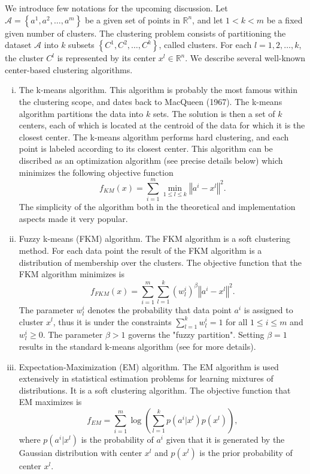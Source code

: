 \documentclass[12pt]{article}
\numberwithin{equation}{section}
\newcommand{\norm}[1]{\left\Vert {#1} \right\Vert} %
\begin{document}
We introduce few notations for the upcoming discussion. Let $\mathcal{A}= \left\lbrace a^1, a^2, \ldots ,a^m \right\rbrace$ be a given set of points in $\mathbb{R}^n$, and let $1 < k < m$ be a fixed given number of clusters. The clustering problem consists of partitioning the dataset $\mathcal{A}$ into $k$ subsets $\left\lbrace C^1, C^2, \ldots ,C^k \right\rbrace$, called clusters. For each $l=1, 2, \ldots ,k$, the cluster $C^l$ is represented by its center $x^l \in \mathbb{R}^n$. We describe several well-known center-based clustering algorithms.
\begin{enumerate}[(i)]
	\item The k-means algorithm. This algorithm is probably the most famous within the clustering scope, and dates back to MacQueen (1967). The k-means algorithm partitions the data into $k$ sets. The solution is then a set of $k$ centers, each of which is located at the centroid of the data for which it is the closest center. The k-means algorithm performs hard clustering, and each point is labeled according to its closest center. This algorithm can be discribed as an optimization algorithm (see precise details below) which minimizes the following objective function
	\begin{equation*}
		f_{KM}(x) = \sum\limits_{i=1}^{m}\min\limits_{1 \le l \le k} \norm{a^i-x^l}^2.
	\end{equation*}
	The simplicity of the algorithm both in the theoretical and implementation aspects made it very popular.
	\item Fuzzy k-means (FKM) algorithm. The FKM algorithm is a soft clustering method. For each data point the result of the FKM algorithm is a distribution of membership over the clusters. The objective function that the FKM algorithm minimizes is
	\begin{equation*}
		f_{FKM}(x) = \sum\limits_{i=1}^{m}\sum\limits_{l=1}^{k}(w^i_l)^\beta \norm{a^i-x^l}^2.
	\end{equation*}
	The parameter $w^i_l$ denotes the probability that data point $a^i$ is assigned to cluster $x^l$, thus it is under the constraints $\sum_{l=1}^{k} w^i_l = 1$ for all $1 \leq i \leq m$ and $w^i_l \geq 0$. The parameter $\beta > 1$ governs the "fuzzy partition". Setting $\beta = 1$ results in the standard k-means algorithm (see  for more details).
	\item Expectation-Maximization (EM) algorithm. The EM algorithm is used extensively in statistical estimation problems for learning mixtures of distributions. It is a soft clustering algorithm. The objective function that EM maximizes is 
	\begin{equation*}
		f_{EM} = \sum\limits_{i=1}^{m} \log \left( \sum\limits_{l=1}^{k} p\left(a^i|x^l\right) p\left(x^l\right) \right),
	\end{equation*}
	where  $p\left(a^i|x^l\right)$ is the probability of $a^i$ given that it is generated by the Gaussian distribution with center $x^l$ and $p\left(x^l\right)$ is the prior probability of center $x^l$.
\end{enumerate}
\end{document}
